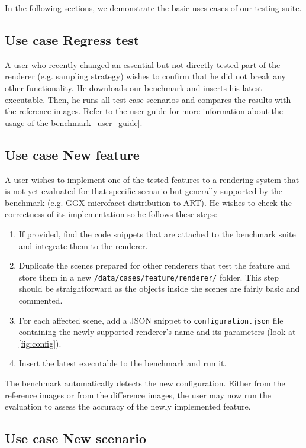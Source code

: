 In the following sections, we demonstrate the basic uses cases of our testing suite.

\subsection{Use case Regress test}

A user who recently changed an essential but not directly tested part of the renderer (e.g. sampling strategy) wishes to confirm that he did not break any other functionality. He downloads our benchmark and inserts his latest executable. Then, he runs all test case scenarios and compares the results with the reference images. Refer to the user guide for more information about the usage of the benchmark~\ref{user_guide}.
 
\subsection{Use case New feature}
\label{sec:frodo}
A user wishes to implement one of the tested features to a rendering system that is not yet evaluated for that specific scenario but generally supported by the benchmark (e.g. GGX microfacet distribution to ART). He wishes to check the correctness of its implementation so he follows these steps:

\begin{enumerate}
	\item If provided, find the code snippets that are attached to the benchmark suite and integrate them to the renderer.
	\item Duplicate the scenes prepared for other renderers that test the feature and store them in a new \texttt{/data/cases/feature/renderer/} folder. This step should be straightforward as the objects inside the scenes are fairly basic and commented.
	\item For each affected scene, add a JSON snippet to \texttt{configuration.json} file containing the newly supported renderer's name and its parameters (look at \autoref{fig:config}).
	\item Insert the latest executable to the benchmark and run it.
\end{enumerate}

The benchmark automatically detects the new configuration. Either from the reference images or from the difference images, the user may now run the evaluation to assess the accuracy of the newly implemented feature.

\subsection{Use case New scenario}

